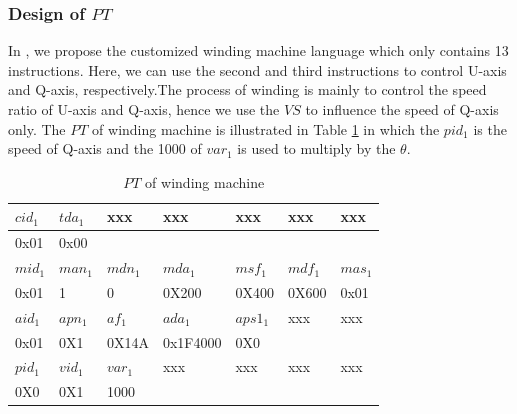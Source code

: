 \documentclass[journal,UTF8]{IEEEtran}
\begin{document}
\subsubsection{Design of $PT$}
In \cite{wu2018customized}, we propose the customized winding machine language which only contains 13 instructions. Here, we can use the second and third instructions to control U-axis and Q-axis, respectively.The process of winding is mainly to control the speed ratio of U-axis and Q-axis, hence we use the $VS$ to influence the speed of Q-axis only. The $PT$ of winding machine is illustrated in Table \ref{table:PTofWinding} in which the $pid_1$ is the speed of Q-axis and the 1000 of $var_1$ is used to multiply by the $\theta$.
\begin{table}
	\scriptsize \caption{$PT$ of winding machine}
	\label{table:PTofWinding}
	\begin{center}
		\renewcommand{\arraystretch}{1.4}
		\setlength\tabcolsep{3pt}
		\begin{tabular}{|p{1cm}|p{1cm}|p{1cm}|p{1cm}|p{1cm}|p{1cm}|p{1cm}|}
			\hline
			$cid_1$  & $tda_1$   &xxx &xxx& xxx  &xxx &xxx \\
			\hline
			0x01&0x00&& &&&\\
			\hline
			$mid_1$   & $man_1$ &$mdn_1$ &$mda_1$&$msf_1$& $mdf_1$  & $mas_1$\\
			\hline
			0x01      & 1     &   0    &0X200   &0X400   & 0X600  &0x01 \\
			\hline
			$aid_1$  & $apn_1$& $af_1$ &$ada_1$ &$aps1_1$  &xxx&xxx\\
			\hline
			0x01     & 0X1    & 0X14A  &0x1F4000 &0X0   & &\\
			\hline
			$pid_1$  &$vid_1$ &$var_1$ &xxx      &xxx   &xxx &xxx\\
            \hline
			0X0      & 0X1    & 1000   &         &   & &\\
	    	\hline
		\end{tabular}
	\end{center}
\end{table}
\end{document}
